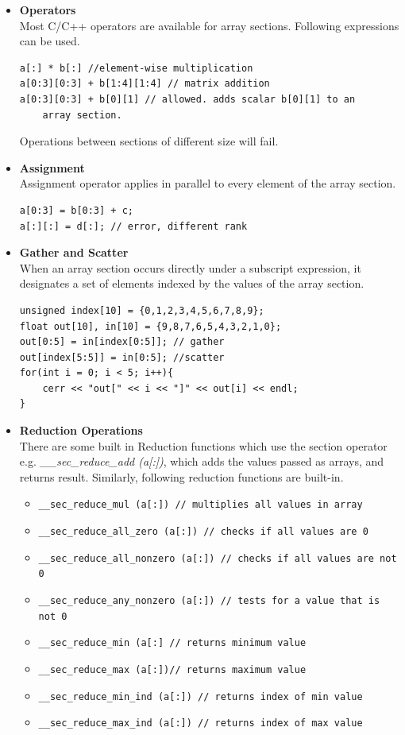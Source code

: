 \documentclass[]{scrartcl}
\begin{document}
\begin{itemize}

\item \textbf{Operators} \\
	Most C/C++ operators are available for array sections. Following expressions can be used.
	
	\begin{lstlisting}
a[:] * b[:]	//element-wise multiplication
a[0:3][0:3] + b[1:4][1:4] // matrix addition
a[0:3][0:3] + b[0][1] // allowed. adds scalar b[0][1] to an
	array section.
	\end{lstlisting}

	Operations between sections of different size will fail.

\item \textbf{Assignment} \\
	Assignment operator applies in parallel to every element of the array section.
	
	\begin{lstlisting}
a[0:3] = b[0:3] + c;
a[:][:] = d[:]; // error, different rank
	\end{lstlisting}

\item \textbf{Gather and Scatter} \\
	When an array section occurs directly under a subscript expression, it designates a set of elements indexed by the values of the array section.
	
	\begin{lstlisting}
unsigned index[10] = {0,1,2,3,4,5,6,7,8,9};
float out[10], in[10] = {9,8,7,6,5,4,3,2,1,0};
out[0:5] = in[index[0:5]]; // gather
out[index[5:5]] = in[0:5]; //scatter
for(int i = 0; i < 5; i++){
	cerr << "out[" << i << "]" << out[i] << endl;
}
	\end{lstlisting}

	\item \textbf{Reduction Operations} \\
	There are some built in Reduction functions which use the section operator e.g. 
	\textit{\_\_sec\_reduce\_add (a[:])}, which adds the values passed as arrays, and
	returns result. Similarly, following reduction functions are built-in.
	\begin{itemize}
		\item \texttt{\_\_sec\_reduce\_mul (a[:]) // multiplies all values in array}
		\item \texttt{\_\_sec\_reduce\_all\_zero (a[:]) // checks if all values are 0}
		\item \texttt{\_\_sec\_reduce\_all\_nonzero (a[:]) // checks if all values are not 0}
		\item \texttt{\_\_sec\_reduce\_any\_nonzero (a[:]) // tests for a value that is not 0}
		\item \texttt{\_\_sec\_reduce\_min (a[:] // returns minimum value}
		\item \texttt{\_\_sec\_reduce\_max (a[:])// returns maximum value}
		\item \texttt{\_\_sec\_reduce\_min\_ind (a[:]) // returns index of min value}
		\item \texttt{\_\_sec\_reduce\_max\_ind (a[:]) // returns index of max value}		
	\end{itemize}
	

\end{itemize}
\end{document}
